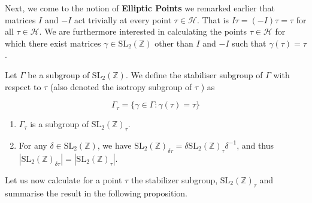Next, we come to the notion of \textbf{Elliptic Points} we remarked earlier that matrices $I$ and $-I$ act trivially at every point $\tau \in \mathcal{H}$. That is $I \tau=(-I) \tau=\tau$ for all $\tau \in \mathcal{H}$. We are furthermore interested in calculating the points $\tau \in \mathcal{H}$ for which there exist matrices $\gamma \in \mathrm{SL}_{2}(\mathbb{Z})$ other than $I$ and $-I$ such that $\gamma(\tau)=\tau$.

\begin{definition}
    Let $\Gamma$ be a subgroup of $\mathrm{SL}_{2}(\mathbb{Z})$. We define the stabiliser subgroup of $\Gamma$ with respect to $\tau$ (also denoted the isotropy subgroup of $\tau$ ) as

$$
\Gamma_{\tau}=\{\gamma \in \Gamma: \gamma(\tau)=\tau\}
$$

\end{definition}

    \begin{remark}
        \begin{enumerate}
            \item $\Gamma_{\tau}$ is a subgroup of $\mathrm{SL}_{2}(\mathbb{Z})_{\tau}$.
            \item For any $\delta \in \mathrm{SL}_{2}(\mathbb{Z})$, we have $\mathrm{SL}_{2}(\mathbb{Z})_{\delta \tau}=\delta \mathrm{SL}_{2}(\mathbb{Z})_{\tau} \delta^{-1}$, and thus $\left|\mathrm{SL}_{2}(\mathbb{Z})_{\delta \tau}\right|=\left|\mathrm{SL}_{2}(\mathbb{Z})_{\tau}\right|$. 
            
        \end{enumerate}
    \end{remark}
Let us now calculate for a point $ \tau$ the stabilizer subgroup, $\mathrm{SL}_{2}(\mathbb{Z})_{\tau}$ and summarise the result in the following proposition.


